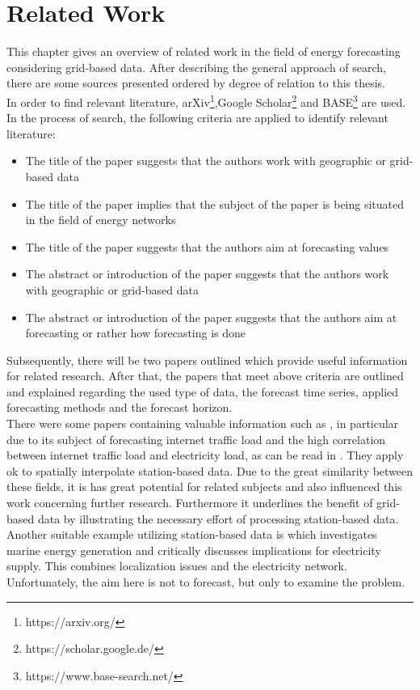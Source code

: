 \chapter{Related Work}
\label{ch:RW}

This chapter gives an overview of related work in the field of energy forecasting considering grid-based data. After describing the general approach of search, there are some sources presented ordered by degree of relation to this thesis.\\

In order to find relevant literature, arXiv\footnote{https://arxiv.org/},Google Scholar\footnote{https://scholar.google.de/} and BASE\footnote{https://www.base-search.net/} are used.\\
In the process of search, the following criteria are applied to identify relevant literature:
\begin{itemize}
  \item The title of the paper suggests that the authors work with geographic or grid-based data
  \item The title of the paper implies that the subject of the paper is being situated in the field of energy networks
  \item The title of the paper suggests that the authors aim at forecasting values
  \item The abstract or introduction of the paper suggests that the authors work with geographic or grid-based data
  \item The abstract or introduction of the paper suggests that the authors aim at forecasting or rather how forecasting is done
\end{itemize}

Subsequently, there will be two papers outlined which provide useful information for related research. After that, the papers that meet above criteria are outlined and explained regarding the used type of data, the forecast time series, applied forecasting methods and the forecast horizon.\\

There were some papers containing valuable information such as , in particular due to its subject of forecasting internet traffic load and the high correlation between internet traffic load and electricity load, as can be read in . They apply \gls{ok} to spatially interpolate station-based data. Due to the great similarity between these fields, it is has great potential for related subjects and also influenced this work \eg concerning further research. Furthermore it underlines the benefit of grid-based data by illustrating the necessary effort of processing station-based data. Another suitable example utilizing station-based data is  which investigates marine energy generation and critically discusses implications for electricity supply. This combines localization issues and the electricity network. Unfortunately, the aim here is not to forecast, but only to examine the problem.\\

